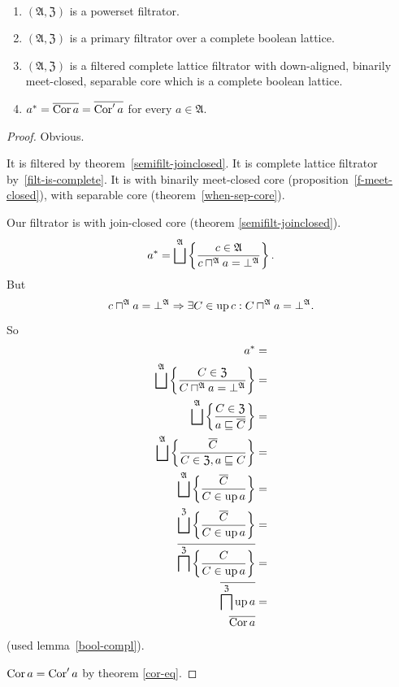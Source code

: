 \begin{thm}\label{compl-and-cor}
~
\begin{enumerate}
\item \label{compl-and-cor-p}$(\mathfrak{A},\mathfrak{Z})$ is a powerset filtrator.
\item \label{compl-and-cor-f}$(\mathfrak{A},\mathfrak{Z})$ is a primary filtrator over a complete boolean lattice.
\item \label{compl-and-cor-fltr}$(\mathfrak{A},\mathfrak{Z})$ is a filtered
complete lattice filtrator with down-aligned, binarily meet-closed,
separable core which is a complete boolean lattice.
\item \label{compl-and-cor-res} $a^{\ast}=\overline{\operatorname{Cor} a}=\overline{\operatorname{Cor}'a}$
for every $a\in\mathfrak{A}$.
\end{enumerate}
\end{thm}
\begin{proof}
\item [\ref{compl-and-cor-p}$\Rightarrow$\ref{compl-and-cor-f}] Obvious.
\item [\ref{compl-and-cor-f}$\Rightarrow$\ref{compl-and-cor-fltr}]
It is filtered by theorem~\ref{semifilt-joinclosed}. It is complete lattice filtrator by~\ref{filt-is-complete}.
It is with binarily meet-closed core (proposition~\ref{f-meet-closed}),
with separable core (theorem~\ref{when-sep-core}).
\item [\ref{compl-and-cor-fltr}$\Rightarrow$\ref{compl-and-cor-res}]
Our filtrator is with join-closed core (theorem \ref{semifilt-joinclosed}).
\[ a^{\ast}=\bigsqcup^{\mathfrak{A}}\setcond{c\in\mathfrak{A}}{c\sqcap^{\mathfrak{A}}a=\bot^{\mathfrak{A}}}. \]
But \[c\sqcap^{\mathfrak{A}}a=\bot^{\mathfrak{A}}\Rightarrow\exists C\in\operatorname{up} c:C\sqcap^{\mathfrak{A}}a=\bot^{\mathfrak{A}}.\]
So
\begin{align*}
a^{\ast} & =\\
\bigsqcup^{\mathfrak{A}}\setcond{C\in\mathfrak{Z}}{C\sqcap^{\mathfrak{A}}a=\bot^{\mathfrak{A}}} & =\\
\bigsqcup^{\mathfrak{A}}\setcond{C\in\mathfrak{Z}}{a\sqsubseteq\overline{C}} & =\\
\bigsqcup^{\mathfrak{A}}\setcond{\overline{C}}{C\in\mathfrak{Z},a\sqsubseteq C} & =\\
\bigsqcup^{\mathfrak{A}}\setcond{\overline{C}}{C\in\up a} & =\\
\bigsqcup^{\mathfrak{Z}}\setcond{\overline{C}}{C\in\up a} & =\\
\overline{\bigsqcap^{\mathfrak{Z}}\setcond C{C\in\up a}} & =\\
\overline{\bigsqcap^{\mathfrak{Z}}\up a} & =\\
\overline{\Cor a}
\end{align*}
(used lemma~\ref{bool-compl}).

$\operatorname{Cor} a=\operatorname{Cor}'a$ by theorem \ref{cor-eq}.\end{proof}
